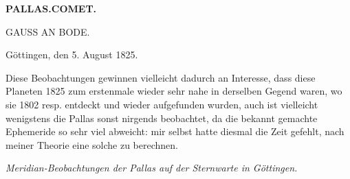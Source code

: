 \clearpage
\noindent{}%
\makebox[12mm][l]{}%
\parbox[t]{\dimexpr\linewidth-24mm\relax}{\centering\footnotesize\bfseries PALLAS.\enspace COMET.\par}%
\par\nobreak\medskip

\begin{center}
{\large GAUSS AN BODE.}
\end{center}


\begin{flushright}
Göttingen, den 5. August 1825.
\end{flushright}

Diese Beobachtungen gewinnen vielleicht dadurch an Interesse, dass diese
Planeten 1825 zum erstenmale wieder sehr nahe in derselben Gegend waren, wo
sie 1802 resp. entdeckt und wieder aufgefunden wurden, auch ist vielleicht
wenigstens die Pallas sonst nirgends beobachtet, da die bekannt gemachte
Ephemeride so sehr viel abweicht: mir selbst hatte diesmal die Zeit gefehlt,
nach meiner Theorie eine solche zu berechnen.

\begin{center}
\emph{Meridian-Beobachtungen der Pallas auf der Sternwarte in Göttingen.}
\end{center}

